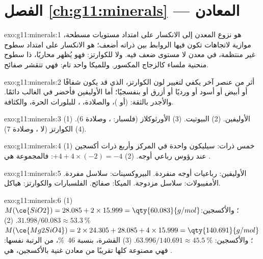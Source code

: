 \section*{الفصل \ref{ch:g11:minerals} --- المعادن}

\begin{solution}{exo:g11:minerals:1}
 هو نزوع المعدن إلى الانكسار على امتداد مستويات مسطحة، موازية
لاتجاهات تكون فيها الروابط بين ذراته أضعف؛  هو
الانكسار على امتداد سطوح غير منتظمة، في معدن لا مستوى ضعف فيه.
ولا  للكوارتز: فهو يُظهر  محاريًا، ذا سطوح منحنية ملساء
كالزجاج المكسور. وللميكا  واحد تام: فهي تتقشر
صفائح.
\end{solution}

\begin{solution}{exo:g11:minerals:2}
أثر من عنصر آخر يكفي لتغيير لون الكوارتز، الذي
قد يكون شفافًا أو أبيض أو أسود أو ورديًا أو أزرق أو بنفسجيًا؛ أما الأوليفين فأخضر في الغالب
دائمًا. والأجدر بالثقة:  (أو )، والصلادة، ،
 للبلورات الحرة، والكثافة.
\end{solution}

\begin{solution}{exo:g11:minerals:3}
(1) الأوليفين. (2) البيوتيت. (3) الأورثوكلاز (فلسبار: ، وصلادة
6). (4) الكوارتز (لا ، وصلادة 7).
\end{solution}

\begin{solution}{exo:g11:minerals:4}
(1) خمس ذرات: سيليكون واحدة في المركز وأربع ذرات أكسجين عند رؤوس
رباعي أوجه. (2) $+4 + 4 \times (-2) = -4$: فالمجموعة هي .
\end{solution}

\begin{solution}{exo:g11:minerals:5}
الأوليفين: رباعيات أوجه منفردة. البيروكسينات: سلاسل مفردة. الأمفيبولات: سلاسل
مزدوجة. الميكا: صفائح. الفلسبارات والكوارتز: هياكل.
\end{solution}

\begin{solution}{exo:g11:minerals:6}
(1) $M(\ce{SiO2}) = 28.085 + 2 \times 15.999 = \qty{60.083}{g/mol}$؛
والأكسجين: $31.998/60.083 \approx \qty{53.3}{\percent}$.
(2) $M(\ce{Mg2SiO4}) = 2 \times 24.305 + 28.085 + 4 \times 15.999 =
\qty{140.691}{g/mol}$؛ والأكسجين: $63.996/140.691 \approx \qty{45.5}{\percent}$.
(3) القشرة، بنسبة \qty{46}{\percent}، من الرتبة نفسها: فهي مصنوعة كلها تقريبًا
من معادن غنية بالأكسجين، هي .
\end{solution}

